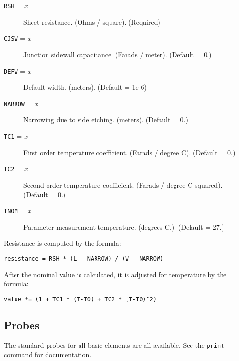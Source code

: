 \begin{description}
  
\item[{\tt RSH} = {\it x}] Sheet resistance. (Ohms / square). (Required)
  
\item[{\tt CJSW} = {\it x}] Junction sidewall capacitance. (Farads /
  meter).  (Default = 0.)
  
\item[{\tt DEFW} = {\it x}] Default width. (meters).  (Default = 1e-6)
  
\item[{\tt NARROW} = {\it x}] Narrowing due to side etching. (meters).
  (Default = 0.)
  
\item[{\tt TC1} = {\it x}] First order temperature coefficient.
  (Farads / degree C).  (Default = 0.)
  
\item[{\tt TC2} = {\it x}] Second order temperature coefficient.
  (Farads / degree C squared).  (Default = 0.)
  
\item[{\tt TNOM} = {\it x}] Parameter measurement temperature.
  (degrees C.).  (Default = 27.)

\end{description}

Resistance is computed by the formula:

\begin{verbatim}
resistance = RSH * (L - NARROW) / (W - NARROW)
\end{verbatim}

After the nominal value is calculated, it is adjusted for temperature
by the formula:

\begin{verbatim}
value *= (1 + TC1 * (T-T0) + TC2 * (T-T0)^2)
\end{verbatim}
\subsection{Probes}

The standard probes for all basic elements are all available.  See the
{\tt print} command for documentation.
